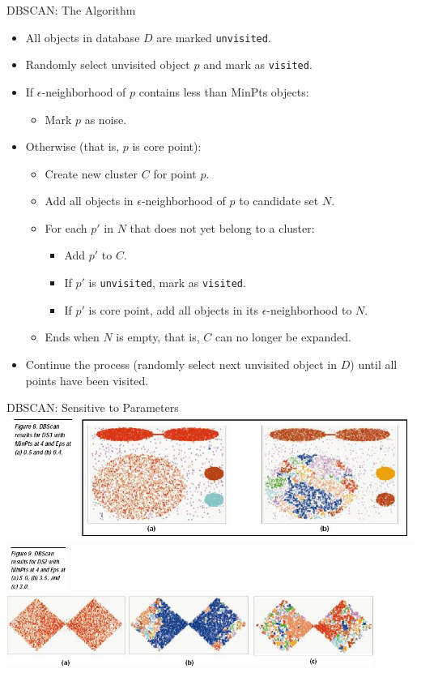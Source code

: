 \begin{frame}{DBSCAN: The Algorithm}
	\begin{itemize}
		\item All objects in database $D$ are marked \texttt{unvisited}.
		\item Randomly select unvisited object $p$ and mark as \texttt{visited}.
		\item If $\epsilon$-neighborhood of $p$ contains less than MinPts 
		objects:
		\begin{itemize}
			\item Mark $p$ as noise.
		\end{itemize}
		\item Otherwise (that is, $p$ is core point):
		\begin{itemize}
			\item Create new cluster $C$ for point $p$.
			\item Add all objects in $\epsilon$-neighborhood of $p$ to 
			candidate set $N$.
			\item For each $p'$ in $N$ that does not yet belong to a cluster:
			\begin{itemize}
				\item Add $p'$ to $C$.
				\item If $p'$ is \texttt{unvisited}, mark as \texttt{visited}.
				\item If $p'$ is core point, add all objects in its 
				$\epsilon$-neighborhood to $N$.
			\end{itemize}
			\item Ends when $N$ is empty, that is, $C$ can no longer be 
			expanded.
		\end{itemize}
		\item Continue the process (randomly select next unvisited object in 
		$D$) until all points have been visited.
	\end{itemize}
\end{frame}

\begin{frame}{DBSCAN: Sensitive to Parameters}
	\centering
	\includegraphics[width=14cm]{img/dbscan.png}\\
	\includegraphics[width=2cm]{img/dbscan3.png}
	\includegraphics[width=12cm]{img/dbscan2.png}
\end{frame}

